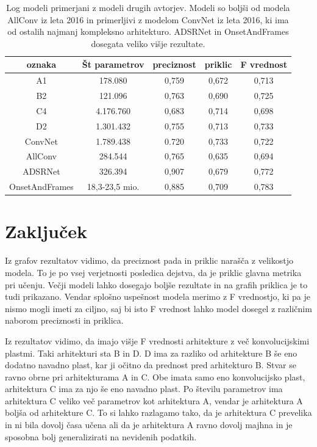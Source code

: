 \documentclass[a4paper, 12pt, openright]{book}
\begin{document}
\begin{table}[]
    \centering
    \begin{tabular}{c|c|c|c|c}
        oznaka & Št parametrov & preciznost & priklic & F vrednost \\
        \hline
        A1 & 178.080 & 0,759 & 0,672 & 0,713 \\
        B2 & 121.096 & 0,763 & 0,690 & 0,725 \\
        C4 & 4.176.760 & 0,683 & 0,714 & 0,698 \\
        D2 & 1.301.432 & 0,755 & 0,713 & 0,733 \\
        \hline
        ConvNet \cite{sigtia2016endtoend} & 1.789.438 & 0.720 & 0,733 & 0,722 \\
        AllConv \cite{kelz2016potential} & 284.544 & 0,765 & 0,635 & 0,694 \\
        ADSRNet \cite{kelz2019deep} & 326.394 & 0,907 & 0,679 & 0,772 \\
        OnsetAndFrames \cite{hawthorne2018onsets} & 18,3-23,5 mio. & 0,885 & 0,709 & 0,783 \\
    \end{tabular}
    \caption{Log modeli primerjani z modeli drugih avtorjev. Modeli so boljši od modela AllConv iz leta 2016 in primerljivi z modelom ConvNet iz leta 2016, ki ima od ostalih najmanj kompleksno arhitekturo. ADSRNet in OnsetAndFrames dosegata veliko višje rezultate.}
    \label{tab:comparison}
\end{table}



\chapter{Zaključek}
\label{ch:discussion}

Iz grafov rezultatov vidimo, da preciznost pada in priklic narašča z velikostjo modela.
To je po vsej verjetnosti posledica dejstva, da je priklic glavna metrika pri učenju.
Večji modeli lahko dosegajo boljše rezultate in na grafih priklica je to tudi prikazano.
Vendar splošno uspešnost modela merimo z F vrednostjo, ki pa je nismo mogli imeti za ciljno, saj bi isto F vrednost lahko model dosegel z različnim naborom preciznosti in priklica.

Iz rezultatov vidimo, da imajo višje F vrednosti arhitekture z več konvolucijskimi plastmi.
Taki arhitekturi sta B in D.
D ima za razliko od arhitekture B še eno dodatno navadno plast, kar ji očitno da prednost pred arhitekturo B.
Stvar se ravno obrne pri arhitekturama A in C.
Obe imata samo eno konvolucijsko plast, arhitektura C ima za njo še eno navadno plast.
Po številu parametrov ima arhitektura C veliko več parametrov kot arhitektura A, vendar je arhitektura A boljša od arhitekture C.
To si lahko razlagamo tako, da je arhitektura C prevelika in ni bila dovolj časa učena ali da je arhitektura A ravno dovolj majhna in je sposobna bolj generalizirati na nevidenih podatkih.
\end{document}
